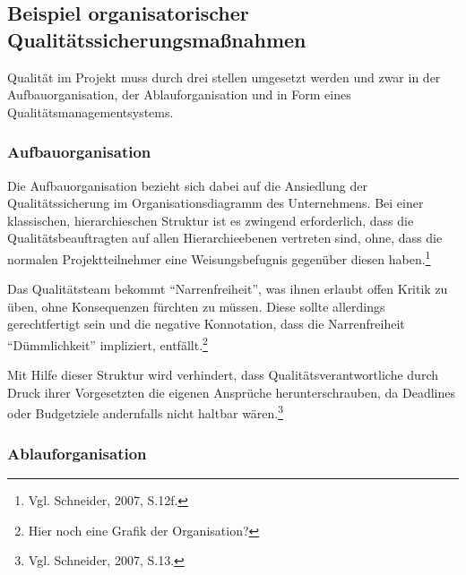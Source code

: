 
        \subsection{Beispiel organisatorischer Qualitätssicherungsmaßnahmen}

            Qualität im Projekt muss durch drei stellen umgesetzt werden und zwar in der Aufbauorganisation, der Ablauforganisation und in Form eines Qualitätsmanagementsystems.

            \subsubsection{Aufbauorganisation}

                Die Aufbauorganisation bezieht sich dabei auf die Ansiedlung der Qualitätssicherung im Organisationsdiagramm des Unternehmens. Bei einer klassischen, hierarchieschen Struktur ist es zwingend erforderlich, dass die Qualitätsbeauftragten auf allen Hierarchieebenen vertreten sind, ohne, dass die normalen Projektteilnehmer eine Weisungsbefugnis gegenüber diesen haben.\footnote{Vgl. Schneider, 2007, S.12f.}

                Das Qualitätsteam bekommt \enquote{Narrenfreiheit}, was ihnen erlaubt offen Kritik zu üben, ohne Konsequenzen fürchten zu müssen. Diese sollte allerdings gerechtfertigt sein und die negative Konnotation, dass die Narrenfreiheit \enquote{Dümmlichkeit} impliziert, entfällt.\footnote{Hier noch eine Grafik der Organisation?}

                Mit Hilfe dieser Struktur wird verhindert, dass Qualitätsverantwortliche durch Druck ihrer Vorgesetzten die eigenen Ansprüche herunterschrauben, da Deadlines oder Budgetziele andernfalls nicht haltbar wären.\footnote{Vgl. Schneider, 2007, S.13.}

            \subsubsection{Ablauforganisation}

